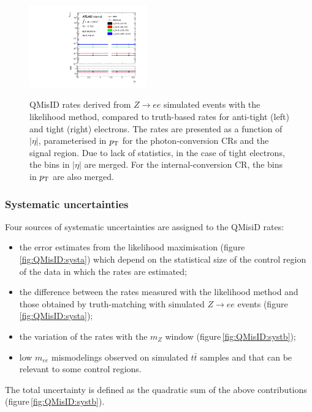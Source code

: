 \begin{figure}[tb!]
  {\includegraphics[width=0.45\textwidth]{figures/qmisid/crateMCZ_MCZtruth_tight_m2}}
  \caption{QMisID rates derived from $Z\rightarrow ee$ simulated events with the likelihood method, compared to truth-based
           rates for anti-tight (left) and tight (right) electrons. The rates are presented as a function of $|\eta|$,
           parameterised in $p_{\mathrm{T}}$ for the photon-conversion CRs and the signal region. Due to lack of statistics, in 
           the case of tight electrons, the bins in $|\eta|$ are merged. For the internal-conversion CR, the bins in 
           $p_{\mathrm{T}}$ are also merged.\label{fig:LikTruthT}}
\end{figure}

\clearpage

\subsubsection{Systematic uncertainties}
\label{Sec:systematic}

Four sources of systematic uncertainties are assigned to the QMisiD rates:

\begin{itemize}
\item the error estimates from the likelihood maximisation (figure\,\ref{fig:QMisID:systa}) which depend on the 
      statistical size of the control region of the data in which the rates are estimated;
\item the difference between the rates measured with the likelihood method and those obtained by truth-matching 
      with simulated $Z\rightarrow ee$ events (figure\,\ref{fig:QMisID:systa});
\item the variation of the rates with the $m_Z$ window
  (figure\,\ref{fig:QMisID:systb});
\item low $m_{ee}$ mismodelings observed on simulated $t\bar{t}$ samples and
  that can be relevant to some control regions.
\end{itemize}

The total uncertainty is defined as the quadratic sum of the above contributions (figure\,\ref{fig:QMisID:systb}).

